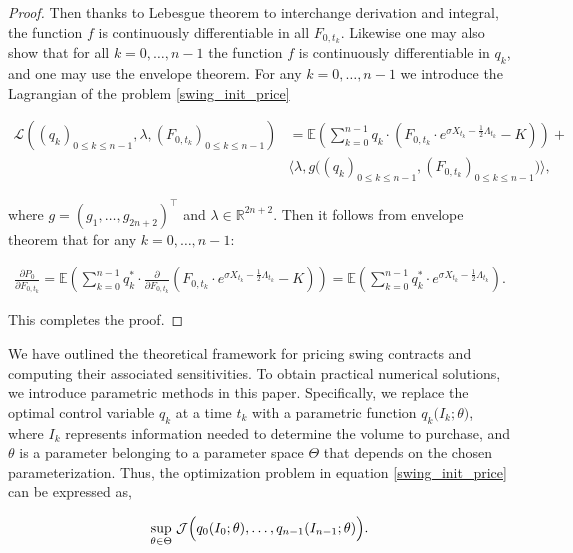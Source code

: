 \documentclass{article}
\numberwithin{equation}{section}
\begin{document}
\begin{proof}
\noindent
Then thanks to Lebesgue theorem to interchange derivation and integral, the function $f$ is continuously differentiable in all $F_{0, t_k}$. Likewise one may also show that for all $k = 0, \ldots, n-1$ the function $f$ is continuously differentiable in $q_{k}$, and one may use the envelope theorem. For any $k=0,\ldots,n-1$ we introduce the Lagrangian of the problem \eqref{swing_init_price}

\begin{align*}
	\mathcal{L}\left((q_{k})_{0 \le k \le n-1},\lambda, \left(F_{0, t_k}\right)_{0 \le k \le n-1} \right) &= \mathbb{E}\left(\sum_{k = 0}^{n-1} q_{k} \cdot \left( F_{0, t_k} \cdot e^{\sigma X_{t_k} - \frac{1}{2}\Lambda_{t_k}} - K \right) \right) +\\
	& \langle \lambda, g\big((q_{k})_{0 \le k \le n-1}, (F_{0, t_k})_{0 \le k \le n-1} \big) \rangle,
\end{align*}

\noindent
where $g = \left(g_1, \ldots, g_{2n+2}\right)^\top$ and $\lambda \in \mathbb{R}^{2n+2}$. Then it follows from envelope theorem that for any $k = 0, \ldots, n-1$:

\begin{align*}
\frac{\partial P_0}{\partial F_{0, t_k}} = \mathbb{E}\left(\sum_{k = 0}^{n-1} q_{k}^{*} \cdot \frac{\partial}{\partial F_{0, t_k}} \left( F_{0, t_k} \cdot e^{\sigma X_{t_k} - \frac{1}{2}\Lambda_{t_k}} - K \right) \right) = \mathbb{E}\left(\sum_{k = 0}^{n-1} q_{k}^{*} \cdot e^{\sigma X_{t_k} - \frac{1}{2}\Lambda_{t_k}} \right).
\end{align*}

\noindent
This completes the proof. 

\end{proof}


We have outlined the theoretical framework for pricing swing contracts and computing their associated sensitivities. To obtain practical numerical solutions, we introduce parametric methods in this paper. Specifically, we replace the optimal control variable $q_k$ at a time $t_k$ with a parametric function $q_k\big(I_k; \theta \big)$, where $I_k$ represents information needed to determine the volume to purchase, and $\theta$ is a parameter belonging to a parameter space $\Theta$ that depends on the chosen parameterization. Thus, the optimization problem in equation \eqref{swing_init_price} can be expressed as,


\begin{equation}
    \underset{\theta \in \Theta}{\sup} \hspace{0.1cm} \mathcal{J}\Big(q_0(I_0; \theta), \ldots, q_{n-1}(I_{n-1}; \theta)\Big).
    \label{param_prob_init}
\end{equation}
\end{document}
